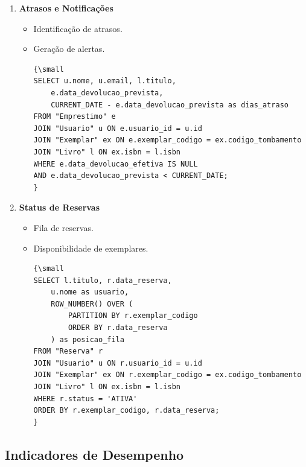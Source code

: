 \documentclass[12pt,a4paper]{article}
\begin{document}
\begin{tcolorbox}[title=Monitoramento do Sistema]
\begin{enumerate}[label=\textbf{MS\arabic*.}]
    \item \textbf{Atrasos e Notificações}
    \begin{itemize}
        \item Identificação de atrasos.
        \item Geração de alertas.
        \begin{verbatim}
{\small
SELECT u.nome, u.email, l.titulo,
    e.data_devolucao_prevista,
    CURRENT_DATE - e.data_devolucao_prevista as dias_atraso
FROM "Emprestimo" e
JOIN "Usuario" u ON e.usuario_id = u.id
JOIN "Exemplar" ex ON e.exemplar_codigo = ex.codigo_tombamento
JOIN "Livro" l ON ex.isbn = l.isbn
WHERE e.data_devolucao_efetiva IS NULL
AND e.data_devolucao_prevista < CURRENT_DATE;
}
        \end{verbatim}
    \end{itemize}

    \item \textbf{Status de Reservas}
    \begin{itemize}
        \item Fila de reservas.
        \item Disponibilidade de exemplares.
        \begin{verbatim}
{\small
SELECT l.titulo, r.data_reserva,
    u.nome as usuario,
    ROW_NUMBER() OVER (
        PARTITION BY r.exemplar_codigo
        ORDER BY r.data_reserva
    ) as posicao_fila
FROM "Reserva" r
JOIN "Usuario" u ON r.usuario_id = u.id
JOIN "Exemplar" ex ON r.exemplar_codigo = ex.codigo_tombamento
JOIN "Livro" l ON ex.isbn = l.isbn
WHERE r.status = 'ATIVA'
ORDER BY r.exemplar_codigo, r.data_reserva;
}
        \end{verbatim}
    \end{itemize}
\end{enumerate}
\end{tcolorbox}

\subsection{Indicadores de Desempenho}
\end{document}
